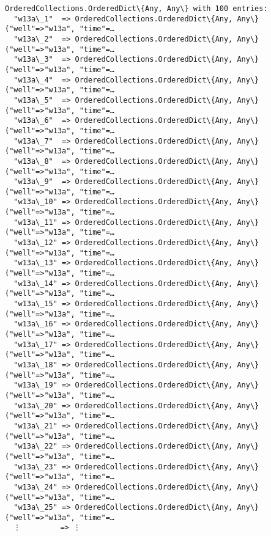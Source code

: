 \documentclass[11pt]{article}
\makeatletter
\newcommand{\boxspacing}{\kern\kvtcb@left@rule\kern\kvtcb@boxsep}
\newcommand{\prompt}[4]{
        {\ttfamily\llap{{\color{#2}[#3]:\hspace{3pt}#4}}\vspace{-\baselineskip}}
    }
\makeatother
\begin{document}
            \begin{tcolorbox}[breakable, size=fbox, boxrule=.5pt, pad at break*=1mm, opacityfill=0]
\prompt{Out}{outcolor}{5}{\boxspacing}
\begin{Verbatim}[commandchars=\\\{\}]
OrderedCollections.OrderedDict\{Any, Any\} with 100 entries:
  "w13a\_1"  => OrderedCollections.OrderedDict\{Any, Any\}("well"=>"w13a", "time"=…
  "w13a\_2"  => OrderedCollections.OrderedDict\{Any, Any\}("well"=>"w13a", "time"=…
  "w13a\_3"  => OrderedCollections.OrderedDict\{Any, Any\}("well"=>"w13a", "time"=…
  "w13a\_4"  => OrderedCollections.OrderedDict\{Any, Any\}("well"=>"w13a", "time"=…
  "w13a\_5"  => OrderedCollections.OrderedDict\{Any, Any\}("well"=>"w13a", "time"=…
  "w13a\_6"  => OrderedCollections.OrderedDict\{Any, Any\}("well"=>"w13a", "time"=…
  "w13a\_7"  => OrderedCollections.OrderedDict\{Any, Any\}("well"=>"w13a", "time"=…
  "w13a\_8"  => OrderedCollections.OrderedDict\{Any, Any\}("well"=>"w13a", "time"=…
  "w13a\_9"  => OrderedCollections.OrderedDict\{Any, Any\}("well"=>"w13a", "time"=…
  "w13a\_10" => OrderedCollections.OrderedDict\{Any, Any\}("well"=>"w13a", "time"=…
  "w13a\_11" => OrderedCollections.OrderedDict\{Any, Any\}("well"=>"w13a", "time"=…
  "w13a\_12" => OrderedCollections.OrderedDict\{Any, Any\}("well"=>"w13a", "time"=…
  "w13a\_13" => OrderedCollections.OrderedDict\{Any, Any\}("well"=>"w13a", "time"=…
  "w13a\_14" => OrderedCollections.OrderedDict\{Any, Any\}("well"=>"w13a", "time"=…
  "w13a\_15" => OrderedCollections.OrderedDict\{Any, Any\}("well"=>"w13a", "time"=…
  "w13a\_16" => OrderedCollections.OrderedDict\{Any, Any\}("well"=>"w13a", "time"=…
  "w13a\_17" => OrderedCollections.OrderedDict\{Any, Any\}("well"=>"w13a", "time"=…
  "w13a\_18" => OrderedCollections.OrderedDict\{Any, Any\}("well"=>"w13a", "time"=…
  "w13a\_19" => OrderedCollections.OrderedDict\{Any, Any\}("well"=>"w13a", "time"=…
  "w13a\_20" => OrderedCollections.OrderedDict\{Any, Any\}("well"=>"w13a", "time"=…
  "w13a\_21" => OrderedCollections.OrderedDict\{Any, Any\}("well"=>"w13a", "time"=…
  "w13a\_22" => OrderedCollections.OrderedDict\{Any, Any\}("well"=>"w13a", "time"=…
  "w13a\_23" => OrderedCollections.OrderedDict\{Any, Any\}("well"=>"w13a", "time"=…
  "w13a\_24" => OrderedCollections.OrderedDict\{Any, Any\}("well"=>"w13a", "time"=…
  "w13a\_25" => OrderedCollections.OrderedDict\{Any, Any\}("well"=>"w13a", "time"=…
  ⋮         => ⋮
\end{Verbatim}
\end{tcolorbox}
        
\end{document}
